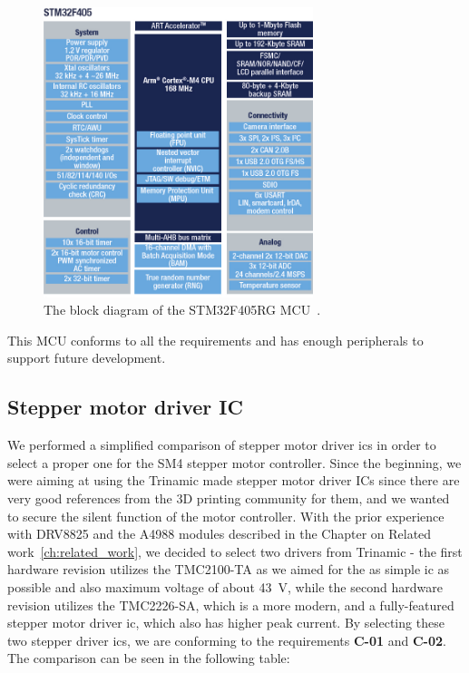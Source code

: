 \begin{figure}[H]
    \centering
    \includegraphics[width=0.7\textwidth]{obrazky/stm32f405_block_diagram}
    \caption{The block diagram of the STM32F405RG MCU~\cite{stmicro_enbd_stm32f405_1mbjpg_nodate}.}
    \label{fig:stm32f405_block_diagram}
\end{figure}

This MCU conforms to all the requirements and has enough peripherals to support future development.

\subsection{Stepper motor driver IC}
\label{subsec:stepper_ic}
We performed a simplified comparison of stepper motor driver \acs{ic}s in order to select a proper one for the SM4 stepper motor controller.
Since the beginning, we were aiming at using the Trinamic made stepper motor driver ICs since there are very good references from the 3D printing community\cite{prusa_original_2017,prusa_original_2019,3daddict_stepper_2020} for them, and we wanted to secure the silent function of the motor controller.
With the prior experience with DRV8825 and the A4988 modules described in the Chapter on Related work~\ref{ch:related_work}, we decided to select two drivers from Trinamic - the first hardware revision utilizes the TMC2100-TA as we aimed for the as simple \acs{ic} as possible and also maximum voltage of about 43~V, while the second hardware revision utilizes the TMC2226-SA, which is a more modern, and a fully-featured stepper motor driver \acs{ic}, which also has higher peak current.
By selecting these two stepper driver \acs{ic}s, we are conforming to the requirements \textbf{C-01} and \textbf{C-02}.
The comparison can be seen in the following table:

